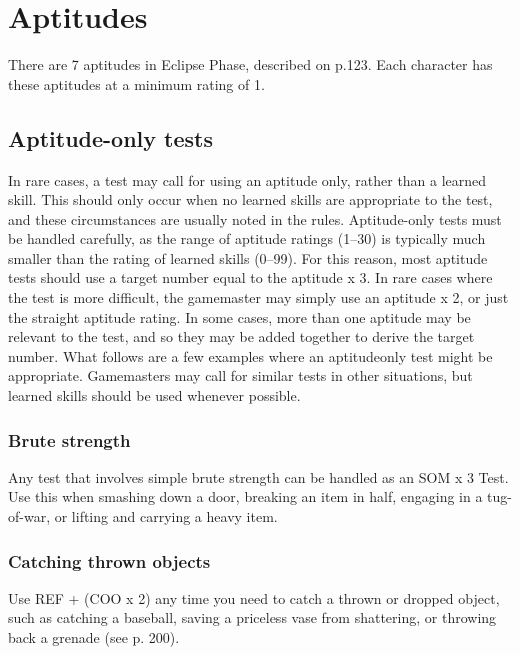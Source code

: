 \section{Aptitudes}
\label{sec:skills:aptitudes}

There are 7 aptitudes in Eclipse Phase, described on p.123. Each character has these aptitudes at a minimum rating of 1.

\subsection{Aptitude-only tests}
\label{sec:skills:aptitude-only-tests}

In rare cases, a test may call for using an aptitude only, rather than a learned skill. This should only occur when no learned skills are appropriate to the test, and these circumstances are usually noted in the rules. Aptitude-only tests must be handled carefully, as the range of aptitude ratings (1–30) is typically much smaller than the rating of learned skills (0–99). For this reason, most aptitude tests should use a target number equal to the aptitude x 3. In rare cases where the test is more difficult, the gamemaster may simply use an aptitude x 2, or just the straight aptitude rating. In some cases, more than one aptitude may be relevant to the test, and so they may be added together to derive the target number. What follows are a few examples where an aptitudeonly test might be appropriate. Gamemasters may call for similar tests in other situations, but learned skills should be used whenever possible.


\subsubsection{Brute strength}
\label{sec:skills:brute-strength}

Any test that involves simple brute strength can be handled as an SOM x 3 Test. Use this when smashing down a door, breaking an item in half, engaging in a tug-of-war, or lifting and carrying a heavy item.


\subsubsection{Catching thrown objects}
\label{sec:skills:catching-thrown-objects}

Use REF + (COO x 2) any time you need to catch a thrown or dropped object, such as catching a baseball, saving a priceless vase from shattering, or throwing back a grenade (see p. 200).


